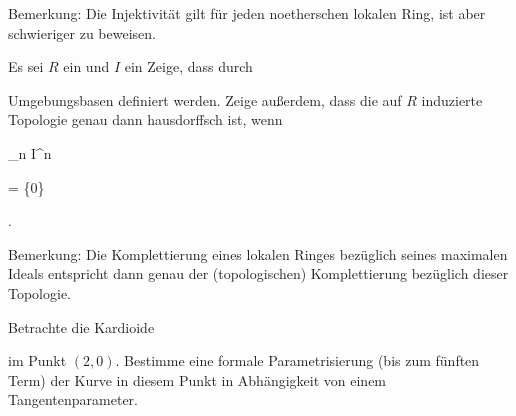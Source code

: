 {Bemerkung: Die Injektivität gilt für jeden noetherschen lokalen Ring, ist aber schwieriger zu beweisen.} {}



{}

{


Es sei $R$ ein
und $I$ ein
Zeige, dass durch


 {  }


Umgebungsbasen definiert werden. Zeige außerdem, dass die auf $R$ induzierte Topologie genau dann hausdorffsch ist, wenn


\mavergleichskette

{\vergleichskette

{ \bigcap_n I^n
}

{ = }{ \{0\}
}

{  }{
}

{    }{
}

{   }{
}

}
{}{}{.}


}

{Bemerkung: Die Komplettierung eines lokalen Ringes bezüglich seines maximalen Ideals entspricht dann genau der (topologischen) Komplettierung bezüglich dieser Topologie.} {}





{}

{


Betrachte die Kardioide


 {  }


im Punkt $(2,0)$. Bestimme eine formale Parametrisierung (bis zum fünften Term) der Kurve in diesem Punkt in Abhängigkeit von einem Tangentenparameter.


}

{} {}



{}

